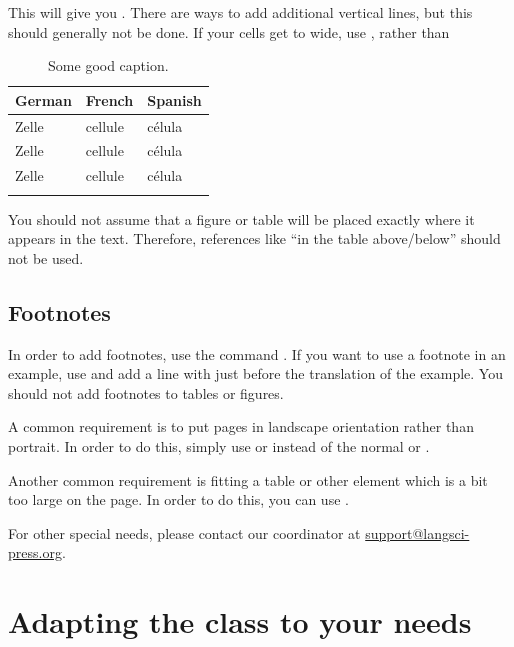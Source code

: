 This will give you  . There are ways to add additional vertical lines, but this should generally not be done. If your cells get to wide, use , rather than 
\begin{table}[h]
  \begin{tabular}{lll}
    \lsptoprule
    German  & French  & Spanish \\
    \midrule
    Zelle   & cellule & célula    \\
    Zelle   & cellule & célula    \\
    Zelle   & cellule & célula    \\
    \lspbottomrule
  \end{tabular}
  \caption{Some good caption.}
  \label{tab:chapterhandle:keytotable}
\end{table}

You should not assume that a figure or table will be placed exactly where it appears in the text. Therefore, references like ``in the table above/below'' should not be used. 

\subsection{Footnotes}
In order to add footnotes, use the command . If you want to use a footnote in an example, use  and add a line with  just before the translation of the example. You should not add footnotes to tables or figures.


A common requirement is to put pages in landscape orientation rather than portrait. In order to do this, simply use  or  instead of the normal  or .

Another common requirement is fitting a table or other element which is a bit too large on the page. In order to do this, you can use .

For other special needs, please contact our coordinator at \url{support@langsci-press.org}. 
\section{Adapting the class to your needs}


